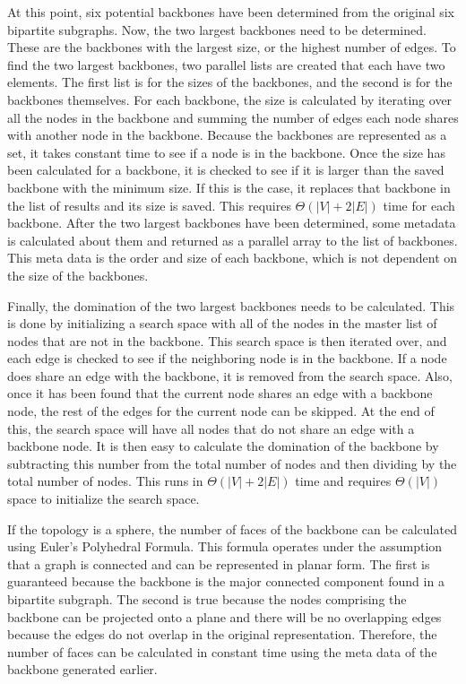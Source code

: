 \documentclass{article}
\begin{document}
        \par
        At this point, six potential backbones have been determined from the original six bipartite subgraphs. Now, the two largest backbones need to be determined. These are the backbones with the largest size, or the highest number of edges. To find the two largest backbones, two parallel lists are created that each have two elements. The first list is for the sizes of the backbones, and the second is for the backbones themselves. For each backbone, the size is calculated by iterating over all the nodes in the backbone and summing the number of edges each node shares with another node in the backbone. Because the backbones are represented as a set, it takes constant time to see if a node is in the backbone. Once the size has been calculated for a backbone, it is checked to see if it is larger than the saved backbone with the minimum size. If this is the case, it replaces that backbone in the list of results and its size is saved. This requires $\Theta(|V| + 2|E|)$ time for each backbone. After the two largest backbones have been determined, some metadata is calculated about them and returned as a parallel array to the list of backbones. This meta data is the order and size of each backbone, which is not dependent on the size of the backbones.
        \par
        Finally, the domination of the two largest backbones needs to be calculated. This is done by initializing a search space with all of the nodes in the master list of nodes that are not in the backbone. This search space is then iterated over, and each edge is checked to see if the neighboring node is in the backbone. If a node does share an edge with the backbone, it is removed from the search space. Also, once it has been found that the current node shares an edge with a backbone node, the rest of the edges for the current node can be skipped. At the end of this, the search space will have all nodes that do not share an edge with a backbone node. It is then easy to calculate the domination of the backbone by subtracting this number from the total number of nodes and then dividing by the total number of nodes. This runs in $\Theta(|V| + 2|E|)$ time and requires $\Theta(|V|)$ space to initialize the search space.
        \par
        If the topology is a sphere, the number of faces of the backbone can be calculated using Euler's Polyhedral Formula. This formula operates under the assumption that a graph is connected and can be represented in planar form. The first is guaranteed because the backbone is the major connected component found in a bipartite subgraph. The second is true because the nodes comprising the backbone can be projected onto a plane and there will be no overlapping edges because the edges do not overlap in the original representation. Therefore, the number of faces can be calculated in constant time using the meta data of the backbone generated earlier.
\end{document}
